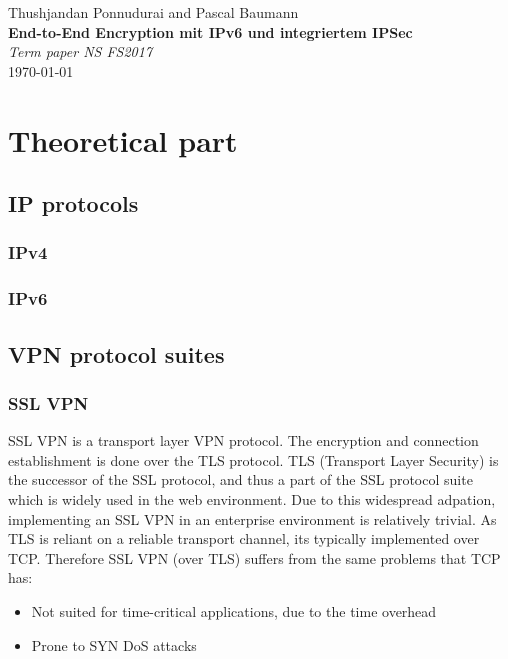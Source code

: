 \documentclass[a4paper]{report}
\newcommand*{\titleAP}{\begingroup %
	\centering
	\vspace*{\baselineskip} %
	
	{\Large Thushjandan Ponnudurai} and {\Large Pascal Baumann}\\[0.167\textheight] %
	
	{\Huge\bfseries End-to-End Encryption mit IPv6 und integriertem IPSec}\\[\baselineskip]
	
	{\Large \textit{Term paper NS FS2017}}\\
	\today
	
	\vspace*{3\baselineskip} %
	\endgroup}
\begin{document}
\titleAP

\newpage

\begin{abstract}
	\blindtext
\end{abstract}

\tableofcontents

\newpage

\chapter{Theoretical part}
\label{ch:Theory}

\section{IP protocols}
\label{sec:IPprot}

\subsection{IPv4}
\label{ssec:IPv4}

\subsection{IPv6}
\label{ssec:IPv6}

\section{VPN protocol suites}
\label{sec:VPNs}

\subsection{SSL VPN}
\label{ssec:sslvpn}

SSL VPN is a transport layer VPN protocol. The encryption and connection establishment is done over the TLS protocol. TLS (Transport Layer Security) is the successor of the SSL protocol, and thus a part of the SSL protocol suite which is widely used in the web environment. Due to this widespread adpation, implementing an SSL VPN in an enterprise environment is relatively trivial. As TLS is reliant on a reliable transport channel, its typically implemented over TCP. \parencite[6,96]{Dierks2008}
Therefore SSL VPN (over TLS) suffers from the same problems that TCP has:

\begin{itemize}
	\item Not suited for time-critical applications, due to the time overhead
	\item Prone to SYN DoS attacks
\end{itemize}
\end{document}

